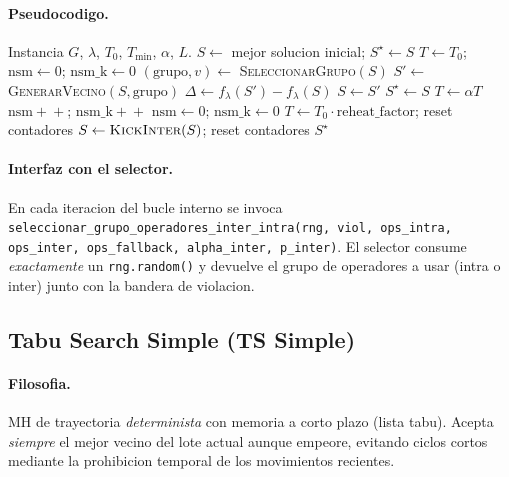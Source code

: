 \documentclass[11pt,a4paper]{article}
\newcommand{\mh}{MH}
\newcommand{\code}[1]{\texttt{#1}}
\begin{document}
\paragraph{Pseudocodigo.}
\begin{algorithm}[H]
\caption{Recocido Simulado (con reheat y kick)}
\begin{algorithmic}[1]
\Require Instancia $G$, $\lambda$, $T_0$, $T_{\min}$, $\alpha$, $L$.
\State $S \gets$ mejor solucion inicial; $S^\star \gets S$
\State $T \gets T_0$;\; $\text{nsm}\gets 0$;\; $\text{nsm\_k}\gets 0$
    \State $(\text{grupo}, v) \gets$ \textsc{SeleccionarGrupo}$(S)$
    \State $S' \gets$ \textsc{GenerarVecino}$(S, \text{grupo})$
    \State $\Delta \gets f_\lambda(S') - f_\lambda(S)$
      \State $S \gets S'$
       $S^\star \gets S$ \EndIf
    \EndIf
  \EndFor
  \State $T \gets \alpha T$
   $\text{nsm}\!+\!+$; $\text{nsm\_k}\!+\!+$
  \Else{} $\text{nsm}\gets 0$; $\text{nsm\_k}\gets 0$
  \EndIf
     $T \gets T_0\cdot\text{reheat\_factor}$;\;
     reset contadores
  \EndIf
     $S\gets\textsc{KickInter}(S)$;\; reset contadores
  \EndIf
\EndWhile
\State \Return $S^\star$
\end{algorithmic}
\end{algorithm}

\paragraph{Interfaz con el selector.} En cada iteracion del bucle
interno se invoca
\code{seleccionar\_grupo\_operadores\_inter\_intra(rng, viol, ops\_intra,
ops\_inter, ops\_fallback, alpha\_inter, p\_inter)}.
El selector consume \emph{exactamente} un \code{rng.random()} y
devuelve el grupo de operadores a usar (intra o inter) junto con la
bandera de violacion.

\subsection{Tabu Search Simple (TS Simple)}\label{sec:ts}

\paragraph{Filosofia.} \mh{} de trayectoria \emph{determinista} con
memoria a corto plazo (lista tabu). Acepta \emph{siempre} el mejor
vecino del lote actual aunque empeore, evitando ciclos cortos mediante
la prohibicion temporal de los movimientos recientes.
\end{document}

